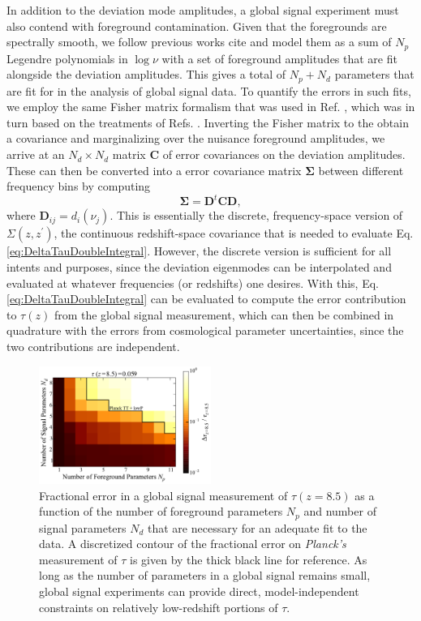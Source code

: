 \documentclass[twocolumn,aps,prd,nofootinbib,showpacs]{revtex4-1}
\begin{document}
In addition to the deviation mode amplitudes, a global signal experiment must also contend with foreground contamination. Given that the foregrounds are spectrally smooth, we follow previous works \acl{cite} and model them as a sum of $N_p$ Legendre polynomials in $\log \nu$ with a set of foreground amplitudes that are fit alongside the deviation amplitudes. This gives a total of $N_p + N_d$ parameters that are fit for in the analysis of global signal data. To quantify the errors in such fits, we employ the same Fisher matrix formalism that was used in Ref. \cite{presley_et_al2015}, which was in turn based on the treatments of Refs. \cite{pritchard_et_al2010,bernardi_et_al2015}. Inverting the Fisher matrix to the obtain a covariance and marginalizing over the nuisance foreground amplitudes, we arrive at an $N_d \times N_d$ matrix $\mathbf{C}$ of error covariances on the deviation amplitudes. These can then be converted into a error covariance matrix $\boldsymbol \Sigma$ between different frequency bins by computing
\begin{equation}
\boldsymbol \Sigma = \mathbf{D}^t \mathbf{C} \mathbf{D},
\end{equation}
where $\mathbf{D}_{ij} = d_i (\nu_j) $. This is essentially the discrete, frequency-space version of $\Sigma ( z, z^\prime)$, the continuous redshift-space covariance that is needed to evaluate Eq. \eqref{eq:DeltaTauDoubleIntegral}. However, the discrete version is sufficient for all intents and purposes, since the deviation eigenmodes can be interpolated and evaluated at whatever frequencies (or redshifts) one desires. With this, Eq. \eqref{eq:DeltaTauDoubleIntegral} can be evaluated to compute the error contribution to $\tau(z)$ from the global signal measurement, which can then be combined in quadrature with the errors from cosmological parameter uncertainties, since the two contributions are independent.

\begin{figure}[!]
\centering
\includegraphics[width=0.5\textwidth]{figures/PlanckTTlowP_globalSigErrors.pdf}
\caption{Fractional error in a global signal measurement of $\tau(z=8.5)$ as a function of the number of foreground parameters $N_p$ and number of signal parameters $N_d$ that are necessary for an adequate fit to the data. A discretized contour of the fractional error on \emph{Planck's} measurement of $\tau$ is given by the thick black line for reference. As long as the number of parameters in a global signal remains small, global signal experiments can provide direct, model-independent constraints on relatively low-redshift portions of $\tau$.}
\label{fig:PlanckTTlowP_globalSigErrors}
\end{figure}
\end{document}
